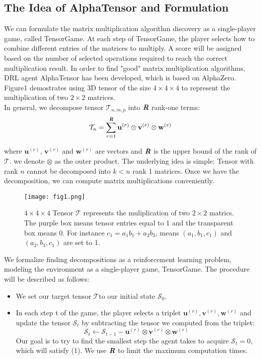 \documentclass[conference]{IEEEtran}
\def\mathbi#1{\textbf{\em#1}}
\begin{document}
\subsection{The Idea of AlphaTensor and Formulation}
We can formulate the matrix multiplication algorithm discovery as a single-player game, called TensorGame. At each step of TensorGame, the
player selects how to combine different entries of the matrices to multiply. A score will be assigned based on the number of selected operations required to reach the correct multiplication result. In order to find "good" matrix multiplication algorithms, DRL agent AlphaTensor has been developed, which is based on AlphaZero.
Figure1 demostrates using 3D tensor of the size $ 4\times 4 \times 4$ to represent the multiplication of two $ 2 \times 2$ matrices.\\
In general, we decompose tensor $ \mathcal{T}_{n,m,p}$ into $\mathbi{R}$ rank-one terms:
\begin{equation}
\mathcal{T}_n = \sum_{r=1}^{\mathbi{R}} \mathbf{u}^{\left( r \right)} \otimes
\mathbf{v}^{\left( r \right)} \otimes \mathbf{w}^{\left( r \right)} \label{eq}
\end{equation}

where $ \mathbf{u}^{\left( r \right)} $, $\mathbf{v}^{\left( r \right)}$ and $\mathbf{w}^{\left( r \right)}$ are vectors and $\mathbi{R}$ is the upper bound of the rank of $ \mathcal{T}$. we denote $\otimes$ as the outer product. The underlying idea is simple: Tensor with rank $n$ cannot be decomposed into $k < n$ rank 1 matrices. Once we have the decomposition, we can compute matrix multiplications conveniently.

\begin{figure}[htbp]
\centerline{\texttt{[image: fig1.png]}}
\caption{ $ 4\times 4 \times 4$ Tensor $\mathcal{T}$ represents the muliplication of two $2 \times 2$ matrics. The purple box means tensor entries equal to 1 and the transparent box means 0. For instance
$ c_1 = a_1b_1 + a_2b_3$, means $ \left( a_1 , b_1 , c_1 \right) $ and $ \left( a_2 , b_3 , c_1 \right)$ are set to 1.}
\label{fig}
\end{figure}

We formalize finding decompositions as a reinforcement learning problem, modeling the environment as a single-player game, TensorGame. The procedure will be described as follows:
\begin{itemize}
\item We set our target tensor $\mathcal{T}$to our initial state $\mathcal{S}_{0}$.
\item In each step t of the game, the player selects a triplet
$\mathbf{u}^{\left( r \right)},
\mathbf{v}^{\left( r \right)},
\mathbf{w}^{\left( r \right)}$ and update the tensor $\mathcal{S}_{t}$ by subtracting the
tensor we computed from the triplet: $$\mathcal{S}_{t} \leftarrow \mathcal{S}_{t-1} -
\mathbf{u}^{\left( r \right)}\otimes
\mathbf{v}^{\left( r \right)}\otimes
\mathbf{w}^{\left( r \right)} $$
Our goal is to try to find the smallest step the agent takes to acquire $\mathcal{S}_{t} = 0$, which will satisfy (1). We use $\mathbi{R}$ to limit the maximum computation times.
\end{itemize}
\end{document}
